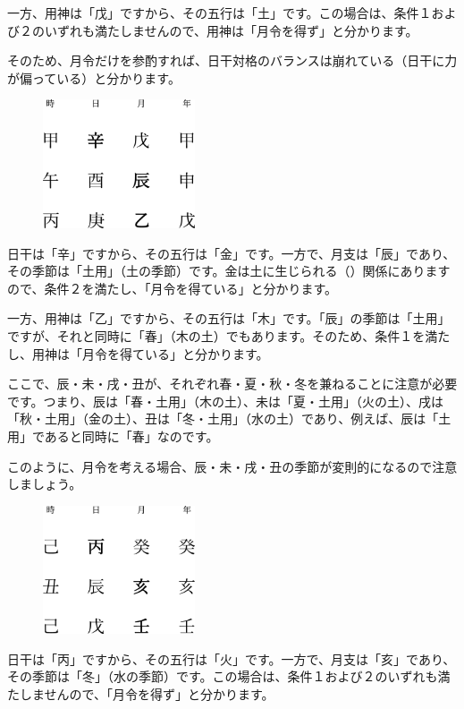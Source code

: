 \documentclass[a5paper,11pt,dvipdfmx]{tarticle}
\begin{document}
一方、用神は「戊」ですから、その五行は「土」です。この場合は、条件１および２のいずれも満たしませんので、用神は「月令を得ず」と分かります。

そのため、月令だけを参酌すれば、日干対格のバランスは崩れている（日干に力が偏っている）と分かります。

\begin{figure}[h]
  \includegraphics[width=45mm,angle=90]{figs/figure6-2.eps}
\end{figure}

日干は「辛」ですから、その五行は「金」です。一方で、月支は「辰」であり、その季節は「土用」（土の季節）です。金は土に生じられる（）関係にありますので、条件２を満たし、「月令を得ている」と分かります。

一方、用神は「乙」ですから、その五行は「木」です。「辰」の季節は「土用」ですが、それと同時に「春」（木の土）でもあります。そのため、条件１を満たし、用神は「月令を得ている」と分かります。

ここで、辰・未・戌・丑が、それぞれ春・夏・秋・冬を兼ねることに注意が必要です。つまり、辰は「春・土用」（木の土）、未は「夏・土用」（火の土）、戌は「秋・土用」（金の土）、丑は「冬・土用」（水の土）であり、例えば、辰は「土用」であると同時に「春」なのです。

このように、月令を考える場合、辰・未・戌・丑の季節が変則的になるので注意しましょう。

\begin{figure}[h]
  \includegraphics[width=45mm,angle=90]{figs/figure6-3.eps}
\end{figure}

日干は「丙」ですから、その五行は「火」です。一方で、月支は「亥」であり、その季節は「冬」（水の季節）です。この場合は、条件１および２のいずれも満たしませんので、「月令を得ず」と分かります。
\end{document}
